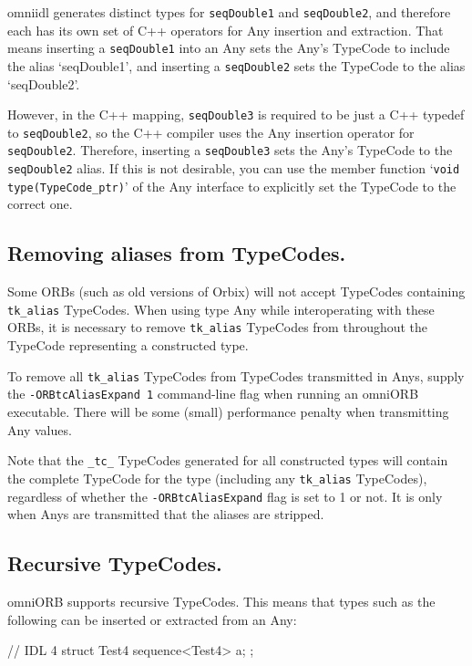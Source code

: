 \documentclass[11pt,twoside,a4paper]{book}
\newcommand{\type}[1]{\texttt{#1}}
\newcommand{\code}[1]{\texttt{#1}}
\begin{document}
omniidl generates distinct types for \type{seqDouble1} and
\type{seqDouble2}, and therefore each has its own set of C++ operators
for Any insertion and extraction. That means inserting a
\type{seqDouble1} into an Any sets the Any's TypeCode to include the
alias `seqDouble1', and inserting a \type{seqDouble2} sets the
TypeCode to the alias `seqDouble2'.

However, in the C++ mapping, \type{seqDouble3} is required to be just
a C++ typedef to \type{seqDouble2}, so the C++ compiler uses the Any
insertion operator for \type{seqDouble2}. Therefore, inserting a
\type{seqDouble3} sets the Any's TypeCode to the \type{seqDouble2}
alias. If this is not desirable, you can use the member function
`\code{void type(TypeCode\_ptr)}' of the Any interface to explicitly
set the TypeCode to the correct one.


\subsection{Removing aliases from TypeCodes.}
Some ORBs (such as old versions of Orbix) will not accept TypeCodes
containing \code{tk\_alias} TypeCodes. When using type Any while
interoperating with these ORBs, it is necessary to remove
\code{tk\_alias} TypeCodes from throughout the TypeCode representing a
constructed type.

To remove all \code{tk\_alias} TypeCodes from TypeCodes transmitted in
Anys, supply the \texttt{-ORBtcAliasExpand 1} command-line flag when
running an omniORB executable. There will be some (small) performance
penalty when transmitting Any values.

Note that the \code{\_tc\_} TypeCodes generated for all constructed
types will contain the complete TypeCode for the type (including any
\code{tk\_alias} TypeCodes), regardless of whether the
\texttt{-ORBtcAliasExpand} flag is set to 1 or not. It is only when
Anys are transmitted that the aliases are stripped.

\subsection{Recursive TypeCodes.}
omniORB supports recursive TypeCodes. This means that types such as
the following can be inserted or extracted from an Any:

\begin{idllisting}
// IDL 4
struct Test4 {
  sequence<Test4> a;
};
\end{idllisting}
\end{document}
